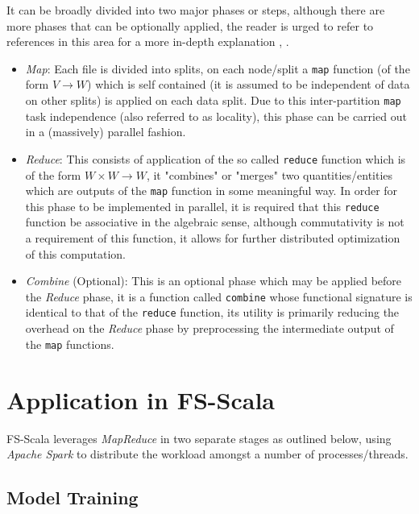 It can be broadly divided into two major phases or steps, although there are more phases that can be optionally applied, the reader is urged to refer to references in this area for a more in-depth explanation \cite{HDFS}, \cite{HadoopBook} \cite{Yarn}.

\begin{itemize}
\item \textit{Map}: Each file is divided into splits, on each node/split a \texttt{map} function (of the form $V \longrightarrow W$) which is self contained (it is assumed to be independent of data on other splits) is applied on each data split. Due to this inter-partition \texttt{map} task independence (also referred to as locality), this phase can be carried out in a (massively) parallel fashion.

\item \textit{Reduce}: This consists of application of the so called \texttt{reduce} function which is of the form $W \times W \longrightarrow W$, it "combines" or "merges" two quantities/entities which are outputs of the \texttt{map} function in some meaningful way. In order for this phase to be implemented in parallel, it is required that this \texttt{reduce} function be associative in the algebraic sense, although commutativity is not a requirement of this function, it allows for further distributed optimization of this computation.

\item \textit{Combine} (Optional): This is an optional phase which may be applied before the \textit{Reduce} phase, it is a function called \texttt{combine} whose functional signature is identical to that of the \texttt{reduce} function, its utility is primarily reducing the overhead on the \textit{Reduce} phase by preprocessing the intermediate output of the \texttt{map} functions.
\end{itemize}


\section{Application in FS-Scala}
FS-Scala leverages \textit{MapReduce} in two separate stages as outlined below, using \textit{Apache Spark} to distribute the workload amongst a number of processes/threads.


\subsection*{Model Training}

